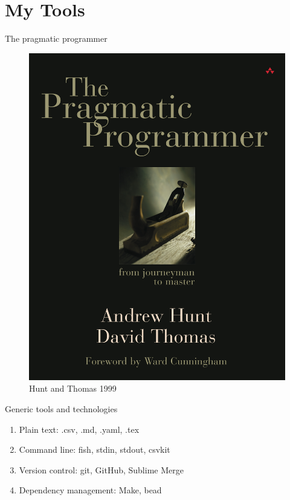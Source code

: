 \documentclass[
  ignorenonframetext,
  aspectratio=54,
]{beamer}
\providecommand{\tightlist}{%
  \setlength{\itemsep}{0pt}\setlength{\parskip}{0pt}}
\begin{document}
\hypertarget{my-tools}{%
\section{My Tools}\label{my-tools}}

\begin{frame}{The pragmatic programmer}
\protect\hypertarget{the-pragmatic-programmer}{}
\begin{figure}
\centering
\includegraphics{assets/img/pragmatic.jpg}
\caption{Hunt and Thomas 1999}
\end{figure}
\end{frame}

\begin{frame}{Generic tools and technologies}
\protect\hypertarget{generic-tools-and-technologies}{}
\begin{enumerate}
\tightlist
\item
  Plain text: .csv, .md, .yaml, .tex
\item
  Command line: fish, stdin, stdout, csvkit
\item
  Version control: git, GitHub, Sublime Merge
\item
  Dependency management: Make, bead
\end{enumerate}
\end{frame}
\end{document}

